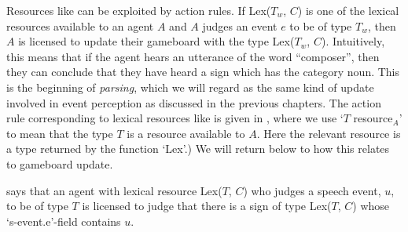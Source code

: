 Resources like \preveg{} can be exploited by action rules.  If
Lex($T_w$, $C$)
is one of the lexical resources available to an agent $A$
and $A$ judges an event $e$ to be of type $T_w$, then $A$ is
licensed to update their gameboard with the type Lex($T_w$, $C$).
Intuitively, this means that if the agent hears an utterance of the
word ``composer'', then they can conclude that they have heard a sign
which has the category noun.  This is the beginning of
\textit{parsing}, which we will regard as the same kind of update
involved in event perception as discussed in the previous chapters.
The action rule corresponding to lexical resources
like \preveg{} is given in \nexteg{}, where we use `$T$
resource$_A$' to mean that the type $T$ is a resource available to
$A$.  Here the relevant resource is a type returned by the function `Lex'.)  We will return below to how
this relates to gameboard update.  
\begin{ex}
  \begin{prooftree}
  \end{prooftree}
  

\end{ex} 
\preveg{} says that an agent with lexical resource Lex($T$, $C$) who
judges a speech event, $u$, to be of type $T$ is licensed to judge that
there is a sign of type Lex($T$, $C$) whose `s-event.e'-field contains
$u$. 

